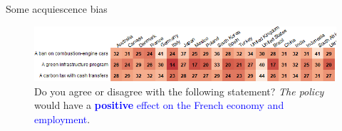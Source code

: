 \begin{frame}{Some acquiescence bias}%
	\begin{figure}[h!]
	\centering
	\caption{%
	Do you agree or disagree with the following statement? \textit{The policy} would have a \textcolor{blue}{\textbf{positive} effect on the French economy and employment}.}
	\includegraphics[width=.95\textwidth]{../figures/country_comparison/policies_positive_effect_positive_countries.png}
	\vspace{-.1cm}
	\end{figure}
\end{frame}


	
	
